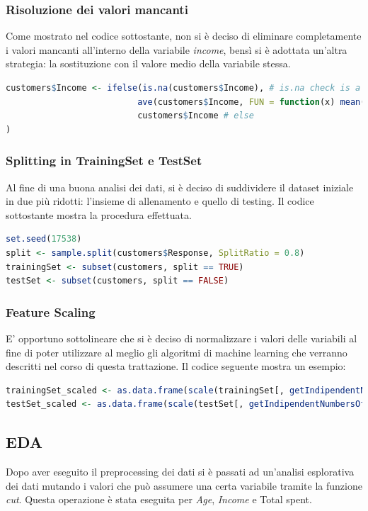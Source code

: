 \documentclass[letterpaper,11pt]{article}
\begin{document}
\subsubsection{Risoluzione dei valori mancanti}
Come mostrato nel codice sottostante, non si è deciso di eliminare completamente i valori mancanti all'interno della variabile \textit{income}, bensì si è adottata un'altra strategia: la sostituzione con il valore medio della variabile stessa.
\begin{lstlisting}[language=R]
customers$Income <- ifelse(is.na(customers$Income), # is.na check is a value is not available
                          ave(customers$Income, FUN = function(x) mean(x, na.rm = TRUE)), # if is not available change with average
                          customers$Income # else
) 
\end{lstlisting}
\subsubsection{Splitting in TrainingSet e TestSet}
Al fine di una buona analisi dei dati, si è deciso di suddividere il dataset iniziale in due più ridotti: l'insieme di allenamento e quello di testing. Il codice sottostante mostra la procedura effettuata.
\begin{lstlisting}[language=R]
set.seed(17538)
split <- sample.split(customers$Response, SplitRatio = 0.8)
trainingSet <- subset(customers, split == TRUE)
testSet <- subset(customers, split == FALSE)
\end{lstlisting}
\subsubsection{Feature Scaling}
E' opportuno sottolineare che si è deciso di normalizzare i valori delle variabili al fine di poter utilizzare al meglio gli algoritmi di machine learning che verranno descritti nel corso di questa trattazione. Il codice seguente mostra un esempio:
\begin{lstlisting}[language=R]
trainingSet_scaled <- as.data.frame(scale(trainingSet[, getIndipendentNumbersOfCol()]))
testSet_scaled <- as.data.frame(scale(testSet[, getIndipendentNumbersOfCol()]))
\end{lstlisting}


\subsection{EDA}
Dopo aver eseguito il preprocessing dei dati si è passati ad un'analisi esplorativa dei dati mutando i valori che può assumere una certa variabile tramite la funzione \textit{cut}. 
Questa operazione è stata eseguita per \textit{Age}, \textit{Income} e Total spent. 
\end{document}
